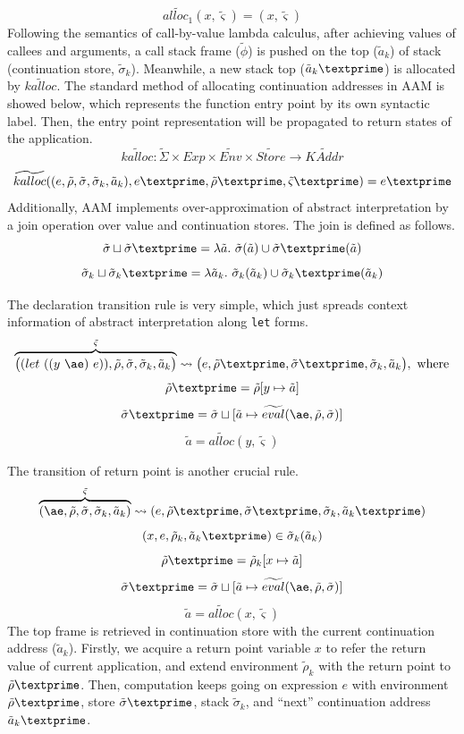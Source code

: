 \documentclass{article}
\begin{document}
\[
\widetilde{alloc_1} (x, \tilde{\varsigma}) = (x, \tilde{\varsigma})
\]
Following the semantics of call-by-value lambda calculus, after achieving values of callees and arguments, a call stack frame ($\widetilde{\phi}$) is pushed on the top ($\tilde{a}_k$) of stack (continuation store, $\tilde{\sigma}_k$).
Meanwhile, a new stack top ($\tilde{a}_k\textprime$) is allocated by $\widetilde{kalloc}$.
The standard method of allocating continuation addresses in AAM is showed below, which represents the function entry point by its own syntactic label. Then, the entry point representation will be propagated to return states of the application.
\[
\widetilde{kalloc} : \tilde{\Sigma} \times Exp \times \widetilde{Env} \times \widetilde{Store} \to \widetilde{KAddr}
\]
\[
\widetilde{kalloc}((e, \tilde{\rho}, \tilde{\sigma}, \tilde{\sigma}_k, \tilde{a}_k), e\textprime, \tilde{\rho}\textprime, \tilde{\varsigma}\textprime) = e\textprime
\]
Additionally, AAM implements over-approximation of abstract interpretation by a join operation over value and continuation stores.
The join is defined as follows.
\[
\tilde{\sigma} \sqcup \tilde{\sigma}\textprime = \lambda \tilde{a}.\ \tilde{\sigma}(\tilde{a}) \cup \tilde{\sigma}\textprime(\tilde{a})
\]
\[
\tilde{\sigma}_k \sqcup \tilde{\sigma}_k\textprime = \lambda \tilde{a}_k.\ \tilde{\sigma}_k(\tilde{a}_k) \cup \tilde{\sigma}_k\textprime(\tilde{a}_k)
\]

The declaration transition rule is very simple, which just spreads context information of abstract interpretation along \verb|let| forms.
\[
\overbrace{
\big((let\ ((y\ \ae)\ e)), \tilde{\rho}, \tilde{\sigma}, \tilde{\sigma}_k, \tilde{a}_k \big)
}^{\tilde{\varsigma}}
\leadsto \big(e,\tilde{\rho}\textprime, \tilde{\sigma}\textprime, \tilde{\sigma}_k, \tilde{a}_k \big), \mbox{ where}
\]
\[
\tilde{\rho}\textprime = \tilde{\rho}[y \mapsto \tilde{a}]
\]
\[
\tilde{\sigma}\textprime = \tilde{\sigma} \sqcup [\tilde{a} \mapsto \widetilde{eval}(\ae, \tilde{\rho}, \tilde{\sigma})]
\]
\[
\tilde{a} = \widetilde{alloc}(y, \tilde{\varsigma})
\]

The transition of return point is another crucial rule.
\[
\overbrace{
(\ae, \tilde{\rho}, \tilde{\sigma}, \tilde{\sigma}_k, \tilde{a}_k)
}^{\tilde{\varsigma}}
\leadsto (e, \tilde{\rho}\textprime, \tilde{\sigma}\textprime, \tilde{\sigma}_k, \tilde{a}_k\textprime)
\]
\[
(x, e, \tilde{\rho}_k, \tilde{a}_k\textprime) \in \tilde{\sigma}_k(\tilde{a}_k)
\]
\[
\tilde{\rho}\textprime = \tilde{\rho}_k[x \mapsto \tilde{a}]
\]
\[
\tilde{\sigma}\textprime = \tilde{\sigma} \sqcup [\tilde{a} \mapsto \widetilde{eval}(\ae, \tilde{\rho}, \tilde{\sigma})]
\]
\[
\tilde{a} = \widetilde{alloc}(x, \tilde{\varsigma})
\]
The top frame is retrieved in continuation store with the current continuation address ($\tilde{a}_k$).
Firstly, we acquire a return point variable $x$ to refer the return value of current application, and extend environment $\tilde{\rho}_k$ with the return point to $\tilde{\rho}\textprime$.
Then, computation keeps going on expression $e$ with environment $\tilde{\rho}\textprime$, store $\tilde{\sigma}\textprime$, stack $\tilde{\sigma}_k$, and ``next'' continuation address $\tilde{a}_k\textprime$.
\end{document}
